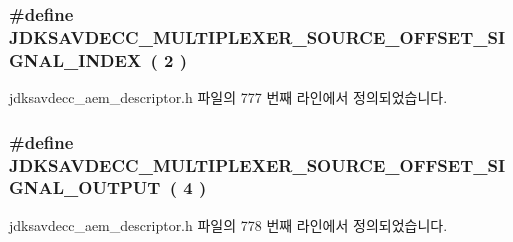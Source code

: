 \subsubsection[{\texorpdfstring{J\+D\+K\+S\+A\+V\+D\+E\+C\+C\+\_\+\+M\+U\+L\+T\+I\+P\+L\+E\+X\+E\+R\+\_\+\+S\+O\+U\+R\+C\+E\+\_\+\+O\+F\+F\+S\+E\+T\+\_\+\+S\+I\+G\+N\+A\+L\+\_\+\+I\+N\+D\+EX}{JDKSAVDECC_MULTIPLEXER_SOURCE_OFFSET_SIGNAL_INDEX}}]{\setlength{\rightskip}{0pt plus 5cm}\#define J\+D\+K\+S\+A\+V\+D\+E\+C\+C\+\_\+\+M\+U\+L\+T\+I\+P\+L\+E\+X\+E\+R\+\_\+\+S\+O\+U\+R\+C\+E\+\_\+\+O\+F\+F\+S\+E\+T\+\_\+\+S\+I\+G\+N\+A\+L\+\_\+\+I\+N\+D\+EX~( 2 )}\hypertarget{group__multiplexer__source_ga8040f79fd2c50314b06d168000902e78}{}\label{group__multiplexer__source_ga8040f79fd2c50314b06d168000902e78}


jdksavdecc\+\_\+aem\+\_\+descriptor.\+h 파일의 777 번째 라인에서 정의되었습니다.

\subsubsection[{\texorpdfstring{J\+D\+K\+S\+A\+V\+D\+E\+C\+C\+\_\+\+M\+U\+L\+T\+I\+P\+L\+E\+X\+E\+R\+\_\+\+S\+O\+U\+R\+C\+E\+\_\+\+O\+F\+F\+S\+E\+T\+\_\+\+S\+I\+G\+N\+A\+L\+\_\+\+O\+U\+T\+P\+UT}{JDKSAVDECC_MULTIPLEXER_SOURCE_OFFSET_SIGNAL_OUTPUT}}]{\setlength{\rightskip}{0pt plus 5cm}\#define J\+D\+K\+S\+A\+V\+D\+E\+C\+C\+\_\+\+M\+U\+L\+T\+I\+P\+L\+E\+X\+E\+R\+\_\+\+S\+O\+U\+R\+C\+E\+\_\+\+O\+F\+F\+S\+E\+T\+\_\+\+S\+I\+G\+N\+A\+L\+\_\+\+O\+U\+T\+P\+UT~( 4 )}\hypertarget{group__multiplexer__source_gaf5b1ff507295023362f8126d473097a9}{}\label{group__multiplexer__source_gaf5b1ff507295023362f8126d473097a9}


jdksavdecc\+\_\+aem\+\_\+descriptor.\+h 파일의 778 번째 라인에서 정의되었습니다.

